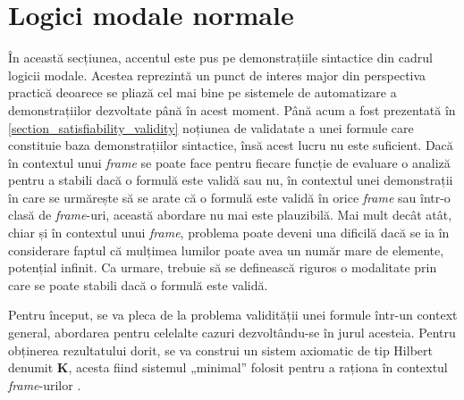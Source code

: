 \documentclass[12pt, openany]{book}
\newcommand{\mysectionreference}[1]{\autoref{#1}}
\begin{document}
        \section{Logici modale normale} %
        \label{section_normal_modal_logics}
            \par{}
                În această secțiunea, accentul este pus pe demonstrațiile sintactice din cadrul logicii modale. Acestea 
                reprezintă un punct de interes major din perspectiva practică deoarece se pliază cel mai bine pe sistemele 
                de automatizare a demonstrațiilor dezvoltate până în acest moment. Până acum a fost prezentată în 
                \mysectionreference{section_satisfiability_validity} noțiunea de validatate a unei formule care constituie 
                baza demonstrațiilor sintactice, însă acest lucru nu este suficient. 
                Dacă în contextul unui \textit{frame} 
                se poate face pentru fiecare funcție de evaluare o analiză pentru a stabili dacă o formulă este validă sau 
                nu, în contextul unei demonstrații în care se urmărește să se arate că o formulă este validă în orice \textit{frame} sau 
                într-o clasă de \textit{frame}-uri, această 
                abordare nu mai este plauzibilă. Mai mult decât atât, chiar și în contextul unui \textit{frame}, problema 
                poate deveni una dificilă dacă se ia în considerare faptul că mulțimea lumilor poate avea un număr mare de 
                elemente, potențial infinit. Ca urmare, trebuie să se definească riguros o modalitate prin care se poate 
                stabili dacă o formulă este validă.

            \par{}
                Pentru început, se va pleca de la problema validității unei formule într-un context general, abordarea 
                pentru celelalte cazuri dezvoltându-se în jurul acesteia. Pentru obținerea rezultatului dorit, se va 
                construi un sistem axiomatic de tip Hilbert denumit \textbf{K}, acesta fiind sistemul „minimal” folosit 
                pentru a raționa în contextul \textit{frame}-urilor \cite{modal_logic}.
\end{document}
